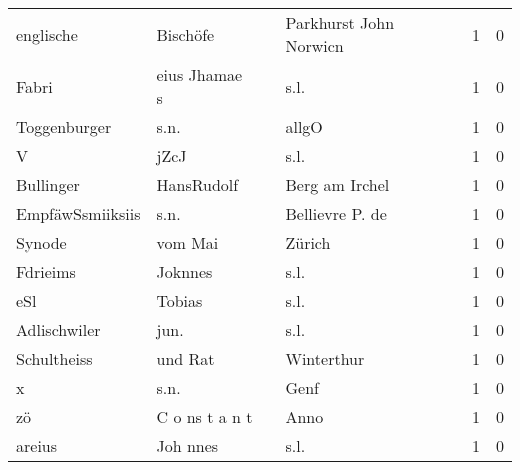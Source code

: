 \begin{center}
\begin{tiny}
\begin{longtabu}{llllrr}
                englische &                           Bischöfe &             &                      Parkhurst John Norwicn &          1 &         0 \\
                    Fabri &                      eius Jhamae s &             &                                        s.l. &          1 &         0 \\
             Toggenburger &                               s.n. &             &                                       allgO &          1 &         0 \\
                        V &                               jZcJ &             &                                        s.l. &          1 &         0 \\
                Bullinger &                         HansRudolf &             &                              Berg am Irchel &          1 &         0 \\
         EmpfäwSsmiiksiis &                               s.n. &             &                             Bellievre P. de &          1 &         0 \\
                   Synode &                            vom Mai &             &                                      Zürich &          1 &         0 \\
                 Fdrieims &                            Joknnes &             &                                        s.l. &          1 &         0 \\
                      eSl &                             Tobias &             &                                        s.l. &          1 &         0 \\
             Adlischwiler &                               jun. &             &                                        s.l. &          1 &         0 \\
              Schultheiss &                            und Rat &             &                                  Winterthur &          1 &         0 \\
                        x &                               s.n. &             &                                        Genf &          1 &         0 \\
                       zö &                     C o ns t a n t &             &                                        Anno &          1 &         0 \\
                   areius &                           Joh nnes &             &                                        s.l. &          1 &         0 \\

\end{longtabu}
\end{tiny}
\end{center}
